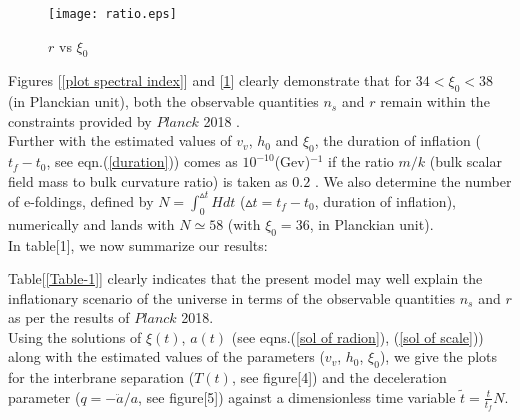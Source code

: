 \documentclass[a4paper]{article}
\begin{document}
\begin{figure}[!h]
\begin{center}
 \centering
 \texttt{[image: ratio.eps]}
 \caption{$r$ vs $\xi_0$}
 \label{plot tensor to scalar ratio}
\end{center}
\end{figure}

Figures [\ref{plot spectral index}] and [\ref{plot tensor to scalar ratio}] 
clearly demonstrate that for $34<\xi_0<38$ (in Planckian unit), both the observable quantities $n_s$ and $r$ remain 
within the constraints provided by $Planck$ 2018 \cite{Planck}.\\
Further with the estimated values of $v_v$, $h_0$ and $\xi_0$, the duration of inflation ($t_f-t_0$, see eqn.(\ref{duration})) comes 
as $10^{-10}$(Gev)$^{-1}$ if the ratio $m/k$ (bulk scalar field mass to bulk curvature ratio) is taken as $0.2$ \cite{GW}. We also determine the number of 
e-foldings, defined by $N = \int_{0}^{\vartriangle t}H dt$ ($\vartriangle t = t_f-t_0$, duration of inflation), 
numerically and lands with $N \simeq 58$ (with $\xi_0 = 36$, in Planckian unit).\\
In table[1], we now summarize our results:\\


\begin{table}[!h]
 \centering
{}
  \caption{Estimated values of various quantities for $\kappa v_v = \frac{\sqrt{h_0}}{M^2} \simeq 10^{-7}$ and $\xi_0 = 36$}
  \label{Table-1}
 \end{table}
 Table[\ref{Table-1}] clearly indicates that the present model may well explain the inflationary scenario of the universe 
 in terms of the observable quantities $n_s$ and $r$ as per the results of $Planck$ 2018.\\
 Using the solutions of $\xi(t)$, $a(t)$ (see eqns.(\ref{sol of radion}), (\ref{sol of scale})) along with the estimated values 
 of the parameters ($v_v$, $h_0$, $\xi_0$), we give the plots for the interbrane separation ($T(t)$, see figure[4]) and the deceleration 
 parameter ($q=-\ddot{a}/a$, see figure[5]) against a dimensionless time variable $\tilde{t} = \frac{t}{t_f}N$.\\
 
\end{document}

